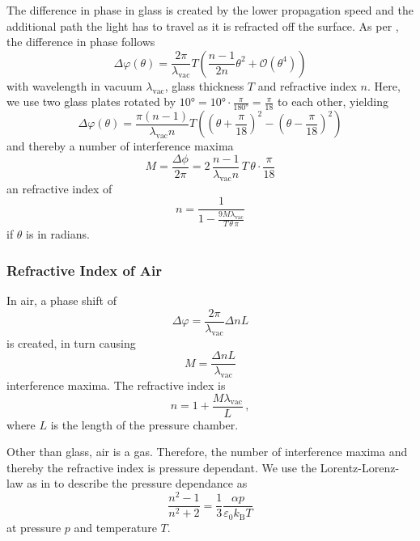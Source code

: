 The difference in phase in glass is created by the lower propagation speed and the additional path the light has to travel as it is refracted off the surface.
As per \cite{v64}, the difference in phase follows
\begin{equation*}
    \Delta \varphi (\theta) = \frac{2 \pi}{\lambda_\text{vac}} T \left(\frac{n-1}{2n} \theta^2 + \mathcal{O}(\theta^4) \right)
\end{equation*}
with wavelength in vacuum $\lambda_\text{vac}$, glass thickness $T$ and refractive index $n$.
Here, we use two glass plates rotated by $10° = 10° \cdot \frac{\pi}{180°} = \frac{\pi}{18}$ to each other, yielding
\begin{equation*}
    \Delta \varphi(\theta) = \frac{\pi (n-1)}{\lambda_\text{vac} n}T \left( \left(\theta + \frac{\pi}{18} \right)^2 - \left(\theta - \frac{\pi}{18}\right)^2\right)
\end{equation*}
and thereby a number of interference maxima
\begin{equation*}
    M = \frac{\Delta \phi}{2 \pi} = 2 \, \frac{n-1}{\lambda_\text{vac} n} \, T \, \theta \cdot \frac{\pi}{18}
\end{equation*}
an refractive index of
\begin{equation}
    n = \frac{1}{1 - \frac{9 M \lambda_\text{vac}}{T \, \theta \, \pi}}
    \label{eq:refractiveindexglass}
\end{equation}
if $\theta$ is in radians.

\subsubsection{Refractive Index of Air}

In air, a phase shift of
\begin{equation*}
    \Delta \varphi = \frac{2 \pi}{\lambda_\text{vac}} \Delta n L 
\end{equation*}
is created, in turn causing
\begin{equation*}
    M = \frac{\Delta n L}{\lambda_\text{vac}}
\end{equation*}
interference maxima.
The refractive index is
\begin{equation}
    n = 1 + \frac{M \lambda_\text{vac}}{L} \,,
    \label{eq:refractiveindexairExp}
\end{equation}
where $L$ is the length of the pressure chamber.

Other than glass, air is a gas. 
Therefore, the number of interference maxima and thereby the refractive index is pressure dependant.
We use the Lorentz-Lorenz-law as in \cite{lololaw} to describe the pressure dependance as
\begin{equation*}
    \frac{n^2 - 1}{n^2 + 2} = \frac{1}{3} \frac{\alpha p}{\varepsilon_0 k_\text{B} T}
\end{equation*}
at pressure $p$ and temperature $T$.

